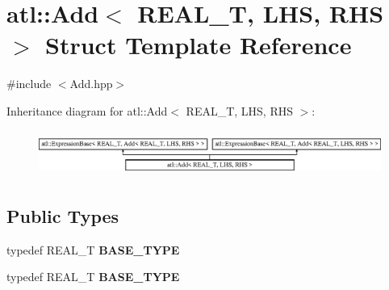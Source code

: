 \hypertarget{structatl_1_1_add}{\section{atl\+:\+:Add$<$ R\+E\+A\+L\+\_\+\+T, L\+H\+S, R\+H\+S $>$ Struct Template Reference}
\label{structatl_1_1_add}
}


{\ttfamily \#include $<$Add.\+hpp$>$}

Inheritance diagram for atl\+:\+:Add$<$ R\+E\+A\+L\+\_\+\+T, L\+H\+S, R\+H\+S $>$\+:\begin{figure}[H]
\begin{center}
\leavevmode
\includegraphics[height=1.521739cm]{structatl_1_1_add}
\end{center}
\end{figure}
\subsection*{Public Types}
\begin{DoxyCompactItemize}
\item 
\hypertarget{structatl_1_1_add_a1afac967194d1e503a20f9f56181833b}{typedef R\+E\+A\+L\+\_\+\+T {\bfseries B\+A\+S\+E\+\_\+\+T\+Y\+P\+E}}\label{structatl_1_1_add_a1afac967194d1e503a20f9f56181833b}

\item 
\hypertarget{structatl_1_1_add_a1afac967194d1e503a20f9f56181833b}{typedef R\+E\+A\+L\+\_\+\+T {\bfseries B\+A\+S\+E\+\_\+\+T\+Y\+P\+E}}\label{structatl_1_1_add_a1afac967194d1e503a20f9f56181833b}

\end{DoxyCompactItemize}
